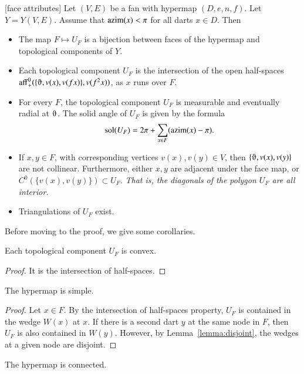 \begin{lemma}[face attributes]\label{lemma:face}
Let $(V,E)$ be a fan with hypermap $(D,e,n,f)$. 
Let $Y=Y(V,E)$.
Assume that ${\operatorname{azim}}(x)<\pi$
for all darts $x\in D$.  Then
\begin{itemize}
\item The map $F\mapsto U_F$ is a bijection between faces of the hypermap
and topological components of $Y$.
\item  Each topological component $U_F$ is the intersection of the open
half-spaces $\op{aff}_+^0(\{\orgn,v(x),v({f x})\},v(f^2 x))$, as $x$ runs
over $F$.
\item For every $F$, the topological component $U_F$ is measurable and
eventually radial at $\orgn$.  The solid angle of $U_F$ is given by the
formula
$$
\operatorname{sol}(U_F) = 2\pi + \sum_{x\in F}({\operatorname{azim}}(x)-\pi).
$$
\item If $x,y\in F$, with corresponding vertices $v(x),v(y)\in V$, then
$\{\orgn,v(x),v(y)\}$ are not collinear.
Furthermore, 
either $x,y$ are adjacent under the face map, or $C^0(\{v(x),v(y)\})\subset U_F$.  {\it That is, the diagonals of the polygon $U_F$ are all interior.}
\item  Triangulations of $U_F$ exist.
\end{itemize}
\end{lemma}

Before moving to the proof, we give some corollaries.

\begin{corollary}
Each topological component $U_F$ is convex.
\end{corollary}

\begin{proof} It is the intersection of half-spaces.
\end{proof}

\begin{corollary}  
The hypermap is simple.
\end{corollary}

\begin{proof}  Let $x\in F$.  By the intersection of half-spaces property, $U_F$ is contained in the wedge $W(x)$ at $x$.  If there is a second dart $y$ at the same node in $F$, then $U_F$ is also contained in $W(y)$. However, by Lemma~\ref{lemma:disjoint}, the wedges at a given node are disjoint.
\end{proof}

\begin{corollary}  
The hypermap is connected.
\end{corollary}

